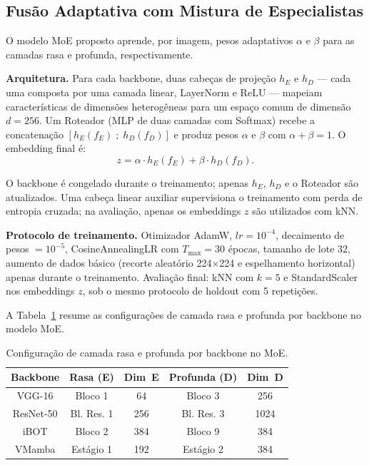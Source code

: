 \documentclass[conference]{IEEEtran}
\begin{document}
\subsection{Fusão Adaptativa com Mistura de Especialistas}

O modelo MoE proposto aprende, por imagem, pesos adaptativos $\alpha$ e
$\beta$ para as camadas rasa e profunda, respectivamente.

\textbf{Arquitetura.} Para cada backbone, duas cabeças de projeção $h_E$
e $h_D$ — cada uma composta por uma camada linear, LayerNorm e ReLU —
mapeiam características de dimensões heterogêneas para um espaço comum
de dimensão $d=256$.
Um Roteador (MLP de duas camadas com Softmax) recebe a concatenação
$[h_E(f_E) \; ; \; h_D(f_D)]$ e produz pesos $\alpha$ e $\beta$ com
$\alpha + \beta = 1$.
O embedding final é:
\begin{equation}
    z = \alpha \cdot h_E(f_E) + \beta \cdot h_D(f_D).
    \label{eq:moe}
\end{equation}

O backbone é congelado durante o treinamento; apenas $h_E$, $h_D$ e o
Roteador são atualizados.
Uma cabeça linear auxiliar supervisiona o treinamento com perda de
entropia cruzada; na avaliação, apenas os embeddings $z$ são utilizados
com kNN.

\textbf{Protocolo de treinamento.}
Otimizador AdamW, $lr = 10^{-4}$, decaimento de pesos $= 10^{-5}$,
CosineAnnealingLR com $T_{\max} = 30$ épocas, tamanho de lote 32,
aumento de dados básico (recorte aleatório 224$\times$224 e espelhamento
horizontal) apenas durante o treinamento.
Avaliação final: kNN com $k=5$ e StandardScaler nos embeddings $z$, sob
o mesmo protocolo de holdout com 5 repetições.

A Tabela~\ref{tab_moe_config} resume as configurações de camada rasa e
profunda por backbone no modelo MoE.

\begin{table}[htbp]
\caption{Configuração de camada rasa e profunda por backbone no MoE.}
\begin{center}
\begin{tabular}{c|c|c|c|c}
\hline
\textbf{Backbone} & \textbf{Rasa (E)} & \textbf{Dim~E}
                  & \textbf{Profunda (D)} & \textbf{Dim~D} \\
\hline
VGG-16    & Bloco 1       & 64   & Bloco 3       & 256  \\
ResNet-50 & Bl. Res. 1    & 256  & Bl. Res. 3    & 1024 \\
iBOT      & Bloco 2       & 384  & Bloco 9       & 384  \\
VMamba    & Estágio 1     & 192  & Estágio 2     & 384  \\
\hline
\end{tabular}
\label{tab_moe_config}
\end{center}
\end{table}
\end{document}
